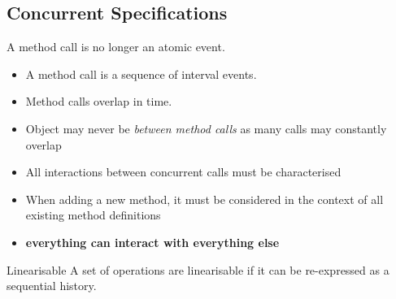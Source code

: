 \subsection{Concurrent Specifications}
A method call is no longer an atomic event.
\begin{itemize}
    \item A method call is a sequence of interval events.
    \item Method calls overlap in time.
    \item Object may never be \textit{between method calls} as many calls may constantly overlap
    \item All interactions between concurrent calls must be characterised
    \item When adding a new method, it must be considered in the context of all existing method definitions 
    \item \textbf{everything can interact with everything else}
\end{itemize}

\begin{definitionbox}{Linearisable}
    A set of operations are linearisable if it can be re-expressed as a sequential history.
\end{definitionbox}

